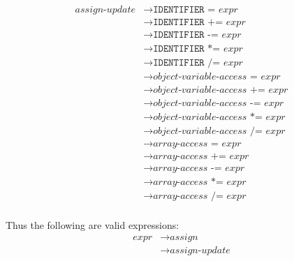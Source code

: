 \documentclass{article}
\begin{document}
\label{sec:assign-update}
\begin{align*}
    \textit{assign-update} &\to \texttt{IDENTIFIER} \texttt{ = } \hyperref[sec:expr]{\textit{expr}} \\
    &\to \texttt{IDENTIFIER} \texttt{ += } \hyperref[sec:expr]{\textit{expr}} \\
    &\to \texttt{IDENTIFIER} \texttt{ -= } \hyperref[sec:expr]{\textit{expr}} \\
    &\to \texttt{IDENTIFIER} \texttt{ *= } \hyperref[sec:expr]{\textit{expr}} \\
    &\to \texttt{IDENTIFIER} \texttt{ /= } \hyperref[sec:expr]{\textit{expr}} \\
    &\to \hyperref[sec:object-variable-access]{\textit{object-variable-access}} \texttt{ = } \hyperref[sec:expr]{\textit{expr}} \\
    &\to \hyperref[sec:object-variable-access]{\textit{object-variable-access}} \texttt{ += } \hyperref[sec:expr]{\textit{expr}} \\
    &\to \hyperref[sec:object-variable-access]{\textit{object-variable-access}} \texttt{ -= } \hyperref[sec:expr]{\textit{expr}} \\
    &\to \hyperref[sec:object-variable-access]{\textit{object-variable-access}} \texttt{ *= } \hyperref[sec:expr]{\textit{expr}} \\
    &\to \hyperref[sec:object-variable-access]{\textit{object-variable-access}} \texttt{ /= } \hyperref[sec:expr]{\textit{expr}} \\
    &\to \hyperref[sec:array-access]{\textit{array-access}} \texttt{ = } \hyperref[sec:expr]{\textit{expr}} \\
    &\to \hyperref[sec:array-access]{\textit{array-access}} \texttt{ += } \hyperref[sec:expr]{\textit{expr}} \\
    &\to \hyperref[sec:array-access]{\textit{array-access}} \texttt{ -= } \hyperref[sec:expr]{\textit{expr}} \\
    &\to \hyperref[sec:array-access]{\textit{array-access}} \texttt{ *= } \hyperref[sec:expr]{\textit{expr}} \\
    &\to \hyperref[sec:array-access]{\textit{array-access}} \texttt{ /= } \hyperref[sec:expr]{\textit{expr}} \\
\end{align*}

Thus the following are valid expressions:
\begin{align*}
    \textit{expr} &\to \hyperref[sec:assign]{\textit{assign}} \\
    &\to \hyperref[sec:assign-update]{\textit{assign-update}} \\
\end{align*}
\end{document}
